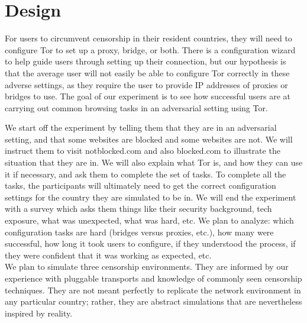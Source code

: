 \documentclass{sig-alternate-hotpets15}
\begin{document}
\section{Design}
For users to circumvent censorship in their resident countries, they will need to configure Tor to set up a proxy, bridge, or both. There is a configuration wizard to help guide users through setting up their connection, but our hypothesis is that the average user will not easily be able to configure Tor correctly in these adverse settings, as they require the user to provide IP addresses of proxies or bridges to use. The goal of our experiment is to see how successful users are at carrying out common browsing tasks in an adversarial setting using Tor. 

We start off the experiment by telling them that they are in an adversarial setting, and that some websites are blocked and some websites are not. We will instruct them to visit notblocked.com and also blocked.com to illustrate the situation that they are in. We will also explain what Tor is, and how they can use it if necessary, and ask them to complete the set of tasks. To complete all the tasks, the participants will ultimately need to get the correct configuration settings for the country they are simulated to be in. We will end the experiment with a survey which asks them things like their security background, tech exposure, what was unexpected, what was hard, etc. We plan to analyze: which configuration tasks are hard (bridges versus proxies, etc.), how many were successful, how long it took users to configure, if they understood the process, if they were confident that it was working as expected, etc. \\

We plan to simulate three censorship environments.
They are informed by our experience with pluggable transports
and knowledge of commonly seen censorship techniques.
They are not meant perfectly to replicate the network environment
in any particular country; rather, they are abstract simulations
that are nevertheless inspired by reality.
\end{document}
